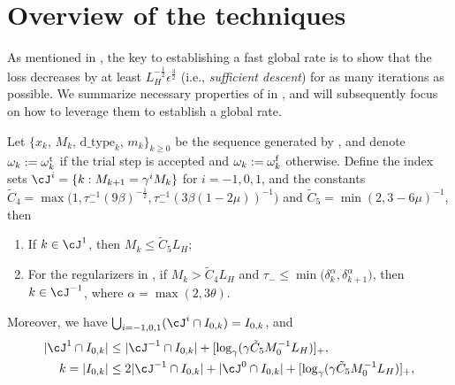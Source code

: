 

\section{Overview of the techniques} \label{sec:main/techniques-overview}


As mentioned in , the key to establishing a fast global rate is to show that the loss decreases by at least $L_H^{-\frac{1}{2}}\epsilon^{\frac{3}{2}}$ (i.e., \emph{sufficient descent}) for as many iterations as possible.
We summarize necessary properties of  in , 
and will subsequently focus on how to leverage them to establish a global rate.


\begin{lemma}
    \label{lem:lipschitz-constant-estimation}
    Let $\{ x_k$, $M_k$, $\text{d\_type}_k$, $m_k \}_{k \ge 0}$ be the sequence generated by , 
    and denote $\omega_k := \omega_k^{\mathrm{t}}$ if the trial step is accepted and $\omega_k := \omega_k^{\mathrm{f}}$ otherwise.
    Define the index sets $\cJ^{i} = \{ k : M_{k+1} = \gamma^{i} M_k \}$ for $i = -1, 0, 1$, and the constants
    $\tilde C_4 = \max\big ( 1, \tau_-^{-1}(9\beta)^{-\frac{1}{2}}, \tau_-^{-1}(3\beta(1 - 2\mu))^{-1}\big )$ and $\tilde C_5 = \min(2, 3 - 6\mu)^{-1}$,
    then 
    \begin{enumerate}
        \item If $k \in \cJ^1$, then $M_k \leq \tilde C_5 L_H$; %
        \item 
        For the regularizers in ,
        if $M_k > \tilde C_4 L_H$ and $\tau_- \leq \min\big ( \delta_k^\alpha, \delta_{k+1}^\alpha \big )$, 
        then $k \in \cJ^{-1}$, where $\alpha = \max(2, 3\theta)$.
    \end{enumerate}
    Moreover, 
    we have
    $\bigcup_{i = -1, 0, 1} ( \cJ^{i} \cap I_{0,k}) = I_{0,k}$, and
    \begin{align}
        \label{eqn:cardinarlity-of-M-set-a}
        |\cJ^{1} \cap I_{0,k}| & \leq
        |\cJ^{-1} \cap I_{0,k}| + [\log_\gamma (\gamma \tilde C_5 M_0^{-1} L_H)]_+, \\
        \label{eqn:cardinarlity-of-M-set}
        k = | I_{0,k} | &\leq 2| \cJ^{-1} \cap I_{0,k} | + |\cJ^0 \cap I_{0,k}| + [\log_\gamma (\gamma \tilde C_5 M_0^{-1} L_H) ]_+,
    \end{align}

\end{lemma}
